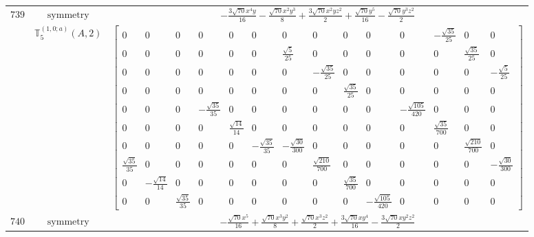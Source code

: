 \documentclass[fleqn,8pt,landscape]{jsarticle}
\begin{document}
\begin{longtable}{ccc}
$ 739 $ & $ \text{symmetry} $ & $ - \frac{3 \sqrt{70} x^{4} y}{16} - \frac{\sqrt{70} x^{2} y^{3}}{8} + \frac{3 \sqrt{70} x^{2} y z^{2}}{2} + \frac{\sqrt{70} y^{5}}{16} - \frac{\sqrt{70} y^{3} z^{2}}{2} $ \\
$  $ & $ \mathbb{T}_{5}^{(1,0;a)}(A,2) $ & $ \begin{bmatrix} 0 & 0 & 0 & 0 & 0 & 0 & 0 & 0 & 0 & 0 & 0 & - \frac{\sqrt{35}}{25} & 0 & 0 \\ 0 & 0 & 0 & 0 & 0 & 0 & \frac{\sqrt{5}}{25} & 0 & 0 & 0 & 0 & 0 & \frac{\sqrt{35}}{25} & 0 \\ 0 & 0 & 0 & 0 & 0 & 0 & 0 & - \frac{\sqrt{35}}{25} & 0 & 0 & 0 & 0 & 0 & - \frac{\sqrt{5}}{25} \\ 0 & 0 & 0 & 0 & 0 & 0 & 0 & 0 & \frac{\sqrt{35}}{25} & 0 & 0 & 0 & 0 & 0 \\ 0 & 0 & 0 & - \frac{\sqrt{35}}{35} & 0 & 0 & 0 & 0 & 0 & 0 & - \frac{\sqrt{105}}{420} & 0 & 0 & 0 \\ 0 & 0 & 0 & 0 & \frac{\sqrt{14}}{14} & 0 & 0 & 0 & 0 & 0 & 0 & \frac{\sqrt{35}}{700} & 0 & 0 \\ 0 & 0 & 0 & 0 & 0 & - \frac{\sqrt{35}}{35} & - \frac{\sqrt{30}}{300} & 0 & 0 & 0 & 0 & 0 & \frac{\sqrt{210}}{700} & 0 \\ \frac{\sqrt{35}}{35} & 0 & 0 & 0 & 0 & 0 & 0 & \frac{\sqrt{210}}{700} & 0 & 0 & 0 & 0 & 0 & - \frac{\sqrt{30}}{300} \\ 0 & - \frac{\sqrt{14}}{14} & 0 & 0 & 0 & 0 & 0 & 0 & \frac{\sqrt{35}}{700} & 0 & 0 & 0 & 0 & 0 \\ 0 & 0 & \frac{\sqrt{35}}{35} & 0 & 0 & 0 & 0 & 0 & 0 & - \frac{\sqrt{105}}{420} & 0 & 0 & 0 & 0 \end{bmatrix} $ \\ \hline
$ 740 $ & $ \text{symmetry} $ & $ - \frac{\sqrt{70} x^{5}}{16} + \frac{\sqrt{70} x^{3} y^{2}}{8} + \frac{\sqrt{70} x^{3} z^{2}}{2} + \frac{3 \sqrt{70} x y^{4}}{16} - \frac{3 \sqrt{70} x y^{2} z^{2}}{2} $ \\

\end{longtable}
\end{document}
